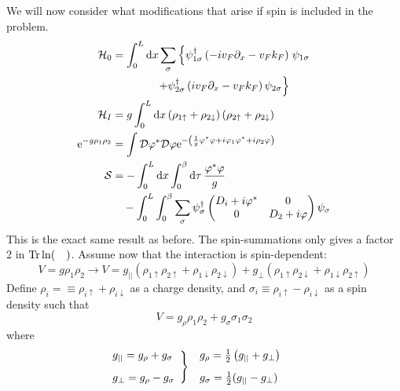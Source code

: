 We will now consider what modifications that arise if spin is included in the problem.
\begin{align*}
\mathcal{H}_0 &= \int_0^L\dd{x}\sum_\sigma\left\{\psi_{1\sigma}^\dagger\left(-iv_F\partial_x -v_Fk_F\right)\right.\psi_{1\sigma} \\ 
&\qquad\qquad\left.+\psi_{2\sigma}^\dagger\left(iv_F\partial_x -v_Fk_F\right)\psi_{2\sigma}\right\} \\
\mathcal{H}_I &= g\int_0^L\dd{x}\left(\rho_{1\uparrow} +\rho_{2\downarrow} \right)\left(\rho_{2\uparrow}+\rho_{2\downarrow}\right)\\
\mathrm{e}^{-g\rho_1\rho_2}&=\int\mathcal{D}\varphi^*\mathcal{D}\varphi\mathrm{e}^{-\left(\frac1g\varphi^*\varphi + i\varphi_1\varphi^*+i\rho_2\varphi\right)}\\
\mathcal{S} &= -\int_0^L\dd{x}\int_0^\beta\dd{\tau}\frac{\varphi^*\varphi}{g} \\ 
&\quad -\int_0^L\int_0^\beta\sum_\sigma\psi_\sigma^\dagger \begin{pmatrix}
D_i+i\varphi^* & 0\\
0& D_2+i\varphi
\end{pmatrix}\psi_\sigma
\end{align*}
This is the exact same result as before. The spin-summations only gives a factor 2 in \(\Tr\ln(\quad)\). Assume now that the interaction is spin-dependent:
\[V = g\rho_1\rho_2 \rightarrow V= g_{||}(\rho_{1\uparrow}\rho_{2\uparrow}+\rho_{1\downarrow}\rho_{2\downarrow}) + g_\perp(\rho_{1\uparrow}\rho_{2\downarrow}+\rho_{1\downarrow}\rho_{2\uparrow})\]
Define \(\rho_i = \equiv \rho_{i\uparrow}+\rho_{i\downarrow}\) as a charge density, and \(\sigma_i\equiv\rho_{i\uparrow}-\rho_{i\downarrow}\) as a spin density such that \[V = g_\rho\rho_1\rho_2 +g_\sigma\sigma_1\sigma_2\]
where
\begin{align}
\begin{split}
\label{eq:interaction_strength}
\left.\begin{array}{@{}l}
g_{||} = g_\rho + g_\sigma \\[2ex]
g_\perp = g_\rho-g_\sigma
\end{array}\right\} &\quad
\begin{array}{@{}l}
g_\rho = \frac12\left(g_{||}+g_\perp\right) \\[2ex]
g_\sigma=\frac12 (g_{||}-g_\perp)
\end{array}
\end{split}
\end{align}

